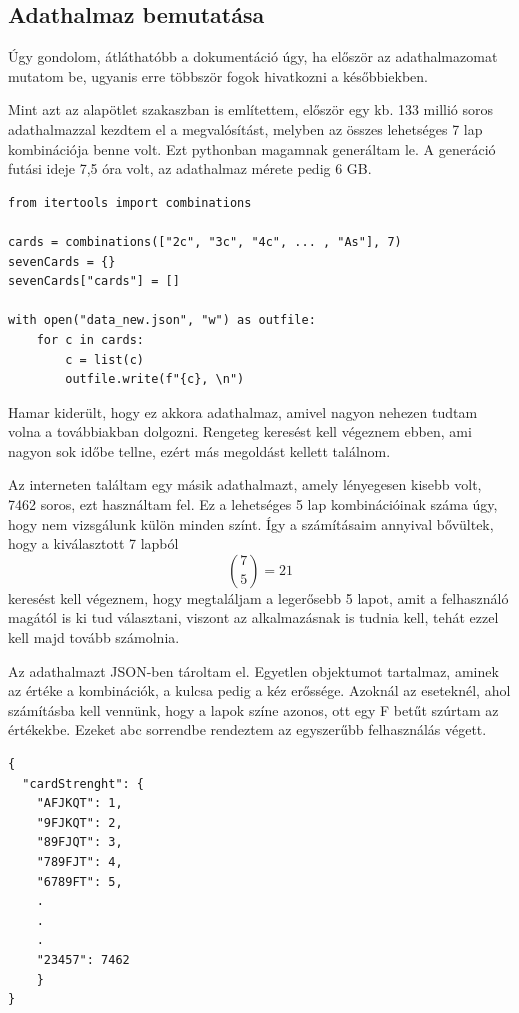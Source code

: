 \subsection{Adathalmaz bemutatása}
Úgy gondolom, átláthatóbb a dokumentáció úgy, ha először az adathalmazomat mutatom be, ugyanis erre többször fogok hivatkozni a későbbiekben. 

Mint azt az alapötlet szakaszban is említettem, először egy kb. 133 millió soros adathalmazzal kezdtem el a megvalósítást, melyben az összes lehetséges 7 lap kombinációja benne volt. Ezt pythonban magamnak generáltam le. A generáció futási ideje 7,5 óra volt, az adathalmaz mérete pedig 6 GB.

\begin{lstlisting}[style=htmlcssjs]
from itertools import combinations

cards = combinations(["2c", "3c", "4c", ... , "As"], 7)
sevenCards = {}
sevenCards["cards"] = []

with open("data_new.json", "w") as outfile:
    for c in cards:
        c = list(c)
        outfile.write(f"{c}, \n")
\end{lstlisting}

Hamar kiderült, hogy ez akkora adathalmaz, amivel nagyon nehezen tudtam volna a továbbiakban dolgozni. Rengeteg keresést kell végeznem ebben, ami nagyon sok időbe tellne, ezért más megoldást kellett találnom.

Az interneten találtam egy másik adathalmazt, amely lényegesen kisebb volt, 7462 soros, ezt használtam fel. 
\cite{chances}
Ez a lehetséges 5 lap kombinációinak száma úgy, hogy nem vizsgálunk külön minden színt. Így a számításaim annyival bővültek, hogy a kiválasztott 7 lapból \[ \binom{7}{5}=21\] keresést kell végeznem, hogy megtaláljam a legerősebb 5 lapot, amit a felhasználó magától is ki tud választani, viszont az alkalmazásnak is tudnia kell, tehát ezzel kell majd tovább számolnia.

Az adathalmazt JSON-ben tároltam el. Egyetlen objektumot tartalmaz, aminek az értéke a kombinációk, a kulcsa pedig a kéz erőssége. Azoknál az eseteknél, ahol számításba kell vennünk, hogy a lapok színe azonos, ott egy F betűt szúrtam az értékekbe. Ezeket abc sorrendbe rendeztem az egyszerűbb felhasználás végett.

\begin{lstlisting}[style=htmlcssjs]
{
  "cardStrenght": {
    "AFJKQT": 1,
    "9FJKQT": 2,
    "89FJQT": 3,
    "789FJT": 4,
    "6789FT": 5,
    .
    .
    .
    "23457": 7462
    }
}
\end{lstlisting}


